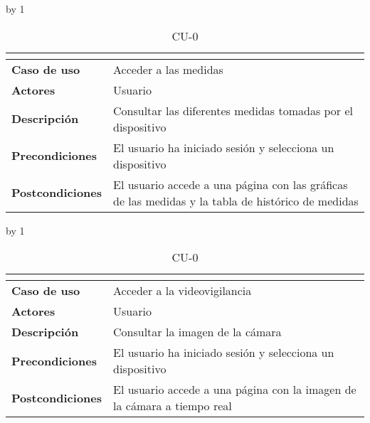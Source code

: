 \advance\cu by 1
\begin{table}[H]
	\centering
	\caption{CU-0\number\cu}
	\begin{tabular}{|l|p{}|}
		\hline
		\multicolumn{2}{|c|}{\cellcolor[HTML]{BFBFBF}{\color[HTML]{000000} \textbf{CU-0\number\cu}}} \\ \hline
		\textbf{Caso de uso}     & Acceder a las medidas                                                                             \\ \hline
		\textbf{Actores}         & Usuario                                                                                           \\ \hline
		\textbf{Descripción}     & Consultar las diferentes medidas tomadas por el dispositivo                                       \\ \hline
		\textbf{Precondiciones}  & El usuario ha iniciado sesión y selecciona un dispositivo                                         \\ \hline
		\textbf{Postcondiciones} & El usuario accede a una página con las gráficas de las medidas y la tabla de histórico de medidas \\ \hline
	\end{tabular}
\end{table}
\advance\cu by 1
\begin{table}[H]
	\centering
	\caption{CU-0\number\cu}
	\begin{tabular}{|l|p{}|}
		\hline
		\multicolumn{2}{|c|}{\cellcolor[HTML]{BFBFBF}{\color[HTML]{000000} \textbf{CU-0\number\cu}}} \\ \hline
		\textbf{Caso de uso}     & Acceder a la videovigilancia                                            \\ \hline
		\textbf{Actores}         & Usuario                                                                 \\ \hline
		\textbf{Descripción}     & Consultar la imagen de la cámara                                        \\ \hline
		\textbf{Precondiciones}  & El usuario ha iniciado sesión y selecciona un dispositivo               \\ \hline
		\textbf{Postcondiciones} & El usuario accede a una página con la imagen de la cámara a tiempo real \\ \hline
	\end{tabular}
\end{table}

